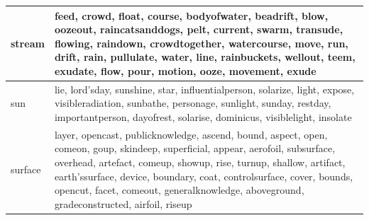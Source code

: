 \documentclass[12pt,a4paper]{report}
\begin{document}
\begin{table}[H]
\begin{center}
\begin{tabular}{ |l|p{13cm}|}
\hline
stream & feed, crowd, float, course, bodyofwater, beadrift, blow, oozeout, raincatsanddogs, pelt, current, swarm, transude, flowing, raindown, crowdtogether, watercourse, move, run, drift, rain, pullulate, water, line, rainbuckets, wellout, teem, exudate, flow, pour, motion, ooze, movement, exude\\
\hline
sun & lie, lord'sday, sunshine, star, influentialperson, solarize, light, expose, visibleradiation, sunbathe, personage, sunlight, sunday, restday, importantperson, dayofrest, solarise, dominicus, visiblelight, insolate\\
\hline
surface & layer, opencast, publicknowledge, ascend, bound, aspect, open, comeon, goup, skindeep, superficial, appear, aerofoil, subsurface, overhead, artefact, comeup, showup, rise, turnup, shallow, artifact, earth'ssurface, device, boundary, coat, controlsurface, cover, bounds, opencut, facet, comeout, generalknowledge, aboveground, gradeconstructed, airfoil, riseup\\
\hline


\end{tabular}
\end{center}
\end{table}
\end{document}
